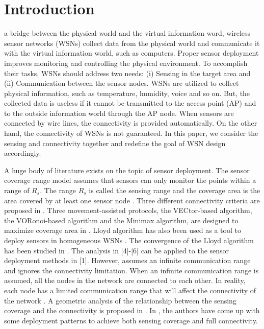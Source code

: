 \documentclass[journal,draftcls,onecolumn,12pt,twoside, narroweqnarray]{IEEEtran}
\begin{document}
\IEEEpeerreviewmaketitle



\section{Introduction}
 a bridge between the physical world and the virtual information word, wireless sensor networks (WSNs) collect data from the physical world and communicate it with the virtual information world, such as computers. Proper sensor deployment improves monitoring and controlling the physical environment.
To accomplish their tasks, WSNs should address two needs: (i) Sensing in the target area and (ii) Communication between the sensor nodes.
WSNs are utilized to collect physical information, such as temperature, humidity, voice and so on. But, the collected data is useless if it cannot be transmitted to the access point (AP) and to the outside information world through the AP node. When sensors are connected by wire lines, the  connectivity is provided automatically.
On the other hand, the connectivity of WSNs is not guaranteed. In this paper, we consider the sensing and connectivity together and redefine the goal of WSN design accordingly.

A huge body of literature exists on the topic of sensor deployment. The sensor coverage range model assumes that sensors can only monitor the points within a range of $R_s$. The range $R_s$ is called the sensing range and the coverage area is the area covered by at least one sensor node \cite{SD}. Three different connectivity criteria are proposed in \cite{CC}. Three movement-assisted protocols, the VECtor-based algorithm, the VORonoi-based algorithm and the Minimax algorithm, are designed to maximize coverage area in \cite{wang1}. Lloyd algorithm has also been used as a tool to deploy sensors in homogeneous WSNs \cite{SD}. The convergence of the Lloyd algorithm has been studied in \cite{kiefferconvergence,wuconvergence,qdu1}. The analysis in [4]-[6] can be applied to the sensor deployment methods in [1].
However, \cite{SD} assumes an infinite communication range and ignores the connectivity limitation. When an infinite communication range is assumed, all the nodes in the network are connected to each other. In reality, each node has a limited communication range that will affect the connectivity of the network \cite{hu1,yousefizadeh1}. A geometric analysis of the relationship between the sensing coverage and the connectivity is proposed in \cite{ICC}. In \cite{DCC}, the authors have come up with some deployment patterns to achieve both sensing coverage and full connectivity.
\end{document}
